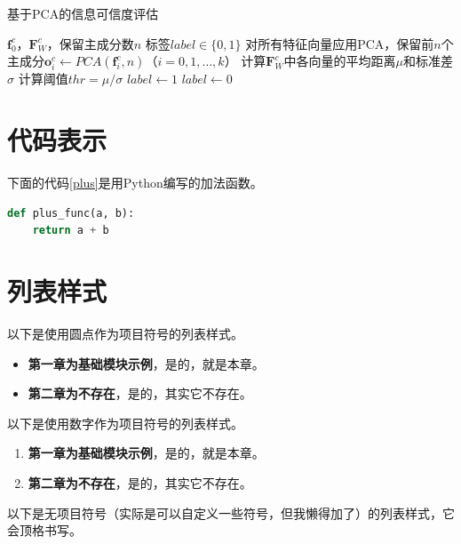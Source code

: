 \documentclass[a4paper,AutoFakeBold,oneside,12pt]{book}
\begin{document}
\begin{algorithm} 
\caption{基于PCA的信息可信度评估} 
\label{PCA_model}
\renewcommand{\algorithmicrequire}{\textbf{输入：}}
\renewcommand{\algorithmicensure}{\textbf{输出：}} 
	\begin{algorithmic}[1] 
	\Require $\bm{f}^{c}_{0}$，$\bm{F}^{c}_{W}$，保留主成分数$n$
	\Ensure 标签$label\in \{0,1\}$
	\State 对所有特征向量应用PCA，保留前$n$个主成分$\bm{o}^{c}_{i} \gets PCA(\bm{f}^{c}_{i}, n)$（$i = 0,1,\ldots,k$）
	\State 计算$\bm{F}^{c}_{W}$中各向量的平均距离$\mu$和标准差$\sigma$
	\State 计算阈值$thr = {\mu} / {\sigma}$
		\State $ label \gets 1 $
	\Else
		\State $ label \gets 0 $
	\EndIf
	\end{algorithmic}
\end{algorithm}

\section{代码表示}
下面的代码\ref{plus}是用Python编写的加法函数。

\begin{lstlisting}[language=Python, caption=加法, label=plus, tabsize=2]  
def plus_func(a, b):
	return a + b
\end{lstlisting}  

\section{列表样式}

以下是使用圆点作为项目符号的列表样式。

\begin{itemize}
\item \textbf{第一章为基础模块示例}，是的，就是本章。
\item \textbf{第二章为不存在}，是的，其实它不存在。
\end{itemize}

以下是使用数字作为项目符号的列表样式。

\begin{enumerate}
\item \textbf{第一章为基础模块示例}，是的，就是本章。
\item \textbf{第二章为不存在}，是的，其实它不存在。
\end{enumerate}

以下是无项目符号（实际是可以自定义一些符号，但我懒得加了）的列表样式，它会顶格书写。
\end{document}
